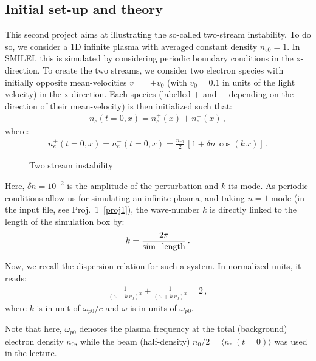 \documentclass[11pt,a4paper]{article}
\begin{document}
\subsection*{Initial set-up and theory}


This second project aims at illustrating the so-called two-stream instability.
To do so, we consider a 1D infinite plasma with averaged constant density $n_{e0} = 1$. 
In SMILEI, this is simulated by considering periodic boundary conditions in the x-direction. 
To create the two streams, we consider two electron species with initially opposite mean-velocities $v_{\pm} = \pm v_0$ (with $v_0 = 0.1$ in units of the light velocity) in the x-direction.
Each species (labelled $+$ and $-$ depending on the direction of their mean-velocity) is then initialized such that:
\begin{eqnarray}\label{eq_2stream1}
n_e(t=0,x) = n_e^+(x) + n_e^-(x)\,,
\end{eqnarray}
where:
\begin{eqnarray}\label{eq_2stream2}
n_e^+(t=0,x) = n_e^-(t=0,x) = \frac{n_{e0}}{2}\,\left[1 + \delta n\,\cos(k\,x)\right]\,.
\end{eqnarray}

\begin{wrapfigure}[15]{r}{0.4\textwidth}
\def\svgwidth{\linewidth}

\label{Fig_2stream.pdf}
\caption{Two stream instability}
\label{Fig_2stream}
\end{wrapfigure}

Here, $\delta n = 10^{-2}$ is the amplitude of the perturbation and $k$ its mode.
As periodic conditions allow us for simulating an infinite plasma, and taking $n=1$ mode  (in the input file, see Proj.~1~\ref{proj1}), the wave-number $k$ is directly linked to the length of the simulation box by:
\begin{eqnarray}\label{eq_k}
k = \frac{2\pi}{\rm sim\_length}\,.
\end{eqnarray}


Now, we recall the dispersion relation for such a system. In normalized units, it reads:
\begin{eqnarray}\label{eq_disprel_2stream}
\frac{1}{(\omega - k\,v_0)^2} + \frac{1}{(\omega + k\,v_0)^2} = 2\,,
\end{eqnarray}
where $k$ is in unit of $\omega_{p0}/c$ and $\omega$ is in units of $\omega_{p0}$.


Note that here, $\omega_{p0}$ denotes the plasma frequency at the total (background) electron density $n_0$, while the beam (half-density) $n_0/2 = \langle n_e^{\pm}(t=0) \rangle$ was used in the lecture.
\end{document}
